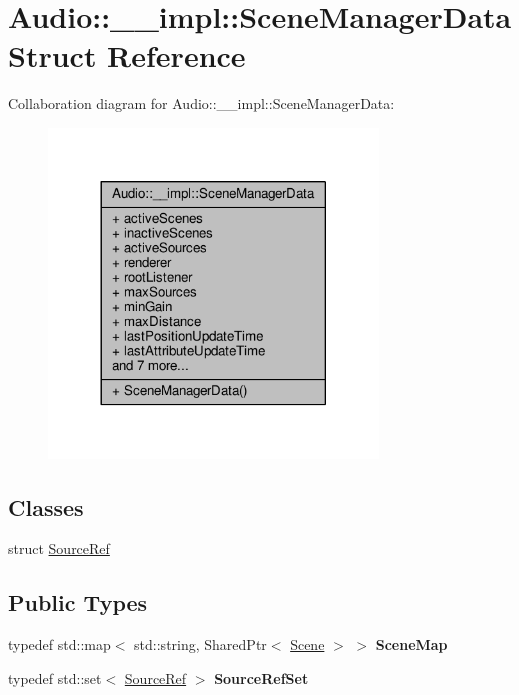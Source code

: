 \hypertarget{structAudio_1_1____impl_1_1SceneManagerData}{}\section{Audio\+:\+:\+\_\+\+\_\+impl\+:\+:Scene\+Manager\+Data Struct Reference}
\label{structAudio_1_1____impl_1_1SceneManagerData}


Collaboration diagram for Audio\+:\+:\+\_\+\+\_\+impl\+:\+:Scene\+Manager\+Data\+:
\nopagebreak
\begin{figure}[H]
\begin{center}
\leavevmode
\includegraphics[width=248pt]{d6/d13/structAudio_1_1____impl_1_1SceneManagerData__coll__graph}
\end{center}
\end{figure}
\subsection*{Classes}
\begin{DoxyCompactItemize}
\item 
struct \hyperlink{structAudio_1_1____impl_1_1SceneManagerData_1_1SourceRef}{Source\+Ref}
\end{DoxyCompactItemize}
\subsection*{Public Types}
\begin{DoxyCompactItemize}
\item 
typedef std\+::map$<$ std\+::string, Shared\+Ptr$<$ \hyperlink{classAudio_1_1Scene}{Scene} $>$ $>$ {\bfseries Scene\+Map}\hypertarget{structAudio_1_1____impl_1_1SceneManagerData_ace6ff562b5b7888015872fc6b16c7e45}{}\label{structAudio_1_1____impl_1_1SceneManagerData_ace6ff562b5b7888015872fc6b16c7e45}

\item 
typedef std\+::set$<$ \hyperlink{structAudio_1_1____impl_1_1SceneManagerData_1_1SourceRef}{Source\+Ref} $>$ {\bfseries Source\+Ref\+Set}\hypertarget{structAudio_1_1____impl_1_1SceneManagerData_aef11366c05840e522f495b28411665a7}{}\label{structAudio_1_1____impl_1_1SceneManagerData_aef11366c05840e522f495b28411665a7}

\end{DoxyCompactItemize}
